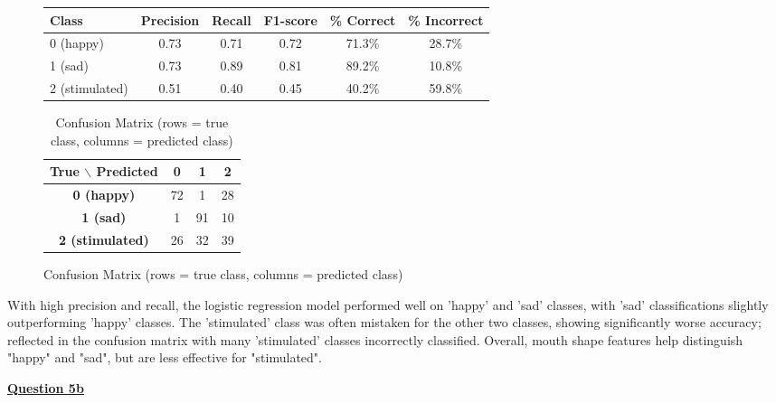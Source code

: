 \documentclass[12pt]{article}
\begin{document}
\begin{figure}[H]
\caption{Logistic Regression Results on Emotion Classification (Mouth Shape Only)}

\begin{minipage}[t]{0.48\textwidth}
\centering
\begin{tabular}{|l|c|c|c|c|c|}
\hline
\textbf{Class} & \textbf{Precision} & \textbf{Recall} & \textbf{F1-score} & \textbf{\% Correct} & \textbf{\% Incorrect} \\
\hline
0 (happy) & 0.73 & 0.71 & 0.72 & 71.3\% & 28.7\% \\
1 (sad) & 0.73 & 0.89 & 0.81 & 89.2\% & 10.8\% \\
2 (stimulated) & 0.51 & 0.40 & 0.45 & 40.2\% & 59.8\% \\
\hline
\end{tabular}
\end{minipage}
\vspace{1em}

\begin{adjustwidth}{-3cm}{}
\begin{table}[H]
\centering
\caption{Confusion Matrix (rows = true class, columns = predicted class)}
\begin{tabular}{c|ccc}
\textbf{True $\backslash$ Predicted} & \textbf{0} & \textbf{1} & \textbf{2} \\
\hline
\textbf{0 (happy)}      & 72 & 1  & 28 \\
\textbf{1 (sad)}        & 1  & 91 & 10 \\
\textbf{2 (stimulated)} & 26 & 32 & 39 \\
\end{tabular}
\end{table}
\end{adjustwidth}

\end{figure}  %
\vspace{-4em}
\noindent\small{With high precision and recall, the logistic regression model performed well on 'happy' and 'sad' classes, with 'sad' classifications slightly outperforming 'happy' classes.
The 'stimulated' class was often mistaken for the other two classes, showing significantly worse accuracy; reflected in the confusion matrix with many 'stimulated' classes incorrectly classified.
Overall, mouth shape features help distinguish "happy" and "sad", but are less effective for "stimulated".}

\vspace{1em}
\noindent\textbf{\underline{Question 5b}}\par
\end{document}
